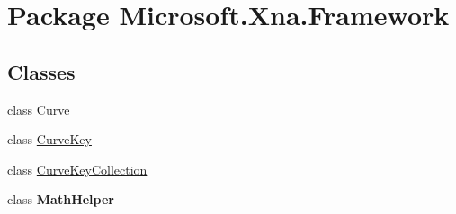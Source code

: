\hypertarget{namespace_microsoft_1_1_xna_1_1_framework}{\section{Package Microsoft.\+Xna.\+Framework}
\label{namespace_microsoft_1_1_xna_1_1_framework}
}
\subsection*{Classes}
\begin{DoxyCompactItemize}
\item 
class \hyperlink{class_microsoft_1_1_xna_1_1_framework_1_1_curve}{Curve}
\item 
class \hyperlink{class_microsoft_1_1_xna_1_1_framework_1_1_curve_key}{Curve\+Key}
\item 
class \hyperlink{class_microsoft_1_1_xna_1_1_framework_1_1_curve_key_collection}{Curve\+Key\+Collection}
\item 
class {\bfseries Math\+Helper}
\end{DoxyCompactItemize}

